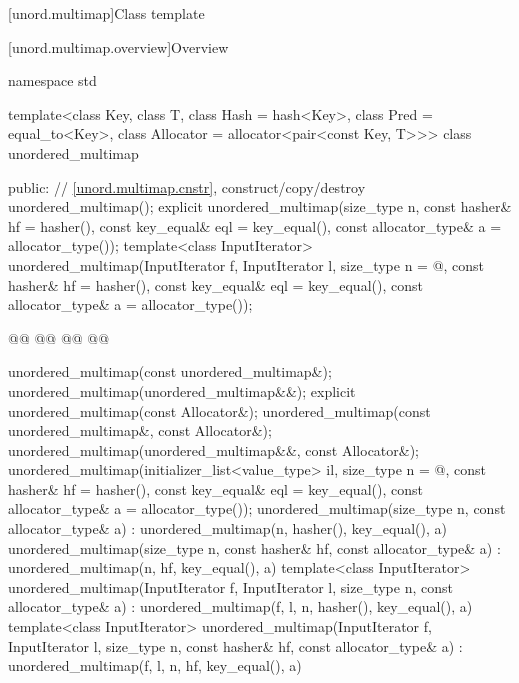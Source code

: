 \documentclass{wg21}
\begin{document}
[unord.multimap]{Class template }%

[unord.multimap.overview]{Overview}

%
\begin{codeblock}
namespace std {
template<class Key,
class T,
class Hash = hash<Key>,
class Pred = equal_to<Key>,
class Allocator = allocator<pair<const Key, T>>>
class unordered_multimap {
    public:
    // \ref{unord.multimap.cnstr}, construct/copy/destroy
    unordered_multimap();
    explicit unordered_multimap(size_type n,
    const hasher& hf = hasher(),
    const key_equal& eql = key_equal(),
    const allocator_type& a = allocator_type());
    template<class InputIterator>
    unordered_multimap(InputIterator f, InputIterator l,
        size_type n = @\seebelow@,
        const hasher& hf = hasher(),
        const key_equal& eql = key_equal(),
        const allocator_type& a = allocator_type());

    @@
    @@
    @@
    @@

    unordered_multimap(const unordered_multimap&);
    unordered_multimap(unordered_multimap&&);
    explicit unordered_multimap(const Allocator&);
    unordered_multimap(const unordered_multimap&, const Allocator&);
    unordered_multimap(unordered_multimap&&, const Allocator&);
    unordered_multimap(initializer_list<value_type> il,
    size_type n = @\seebelow@,
    const hasher& hf = hasher(),
    const key_equal& eql = key_equal(),
    const allocator_type& a = allocator_type());
    unordered_multimap(size_type n, const allocator_type& a)
    : unordered_multimap(n, hasher(), key_equal(), a) { }
    unordered_multimap(size_type n, const hasher& hf, const allocator_type& a)
    : unordered_multimap(n, hf, key_equal(), a) { }
    template<class InputIterator>
    unordered_multimap(InputIterator f, InputIterator l, size_type n, const allocator_type& a)
    : unordered_multimap(f, l, n, hasher(), key_equal(), a) { }
    template<class InputIterator>
    unordered_multimap(InputIterator f, InputIterator l, size_type n, const hasher& hf,
    const allocator_type& a)
    : unordered_multimap(f, l, n, hf, key_equal(), a) { }

}}
\end{codeblock}
\end{document}
